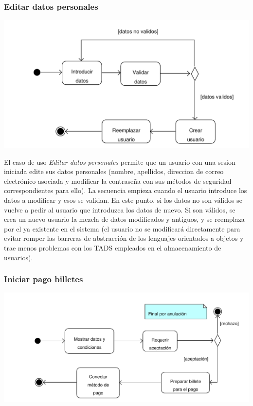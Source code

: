 \documentclass[11pt, a4paper, twoside, titlepage]{article}
\begin{document}
			\subsubsection{Editar datos personales}
				\begin{center}
					\includegraphics[scale=.7]{analisis/diagramas/da_editardatospersonales.pdf}
				\end{center}

				El caso de uso {\itshape Editar datos personales} permite que un usuario con una sesion iniciada edite sus datos personales (nombre, apellidos, direccion de correo electrónico asociada y modificar la contraseña con sus métodos de seguridad correspondientes para ello). 
				La secuencia empieza cuando el usuario introduce los datos a modificar y esos se validan. En este punto, si los datos no son válidos se vuelve a pedir al usuario que introduzca los datos de nuevo. Si son válidos, se crea un nuevo usuario la mezcla de datos modificados y antiguos, y se reemplaza por el ya existente en el sistema (el usuario no se modificará directamente para evitar romper las barreras de abstracción de los lenguajes orientados a objetos y trae menos problemas con los TADS empleados en el almacenamiento de usuarios).

			\subsubsection{Iniciar pago billetes}
				\begin{center}
					\includegraphics[scale=.7]{analisis/diagramas/da_iniciarpagobilletes.pdf}
				\end{center}
\end{document}
